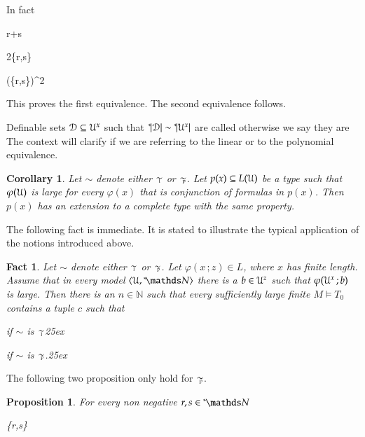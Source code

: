 \documentclass[10pt,oneside, openany]{book}
\renewcommand*{\emph}[1]{%
   \smash{\tikz[baseline]\node[rectangle, fill=green!40, rounded corners, inner xsep=0.5ex, inner ysep=0.2ex, anchor=base, minimum height = 2.7ex]{#1};}}
\def\models{\vDash}
\def\NN{\mathds N}
\def\D{\EuScript D}
\def\U{\EuScript U}
\def\<{\langle}
\def\>{\rangle}
\def\phi{\varphi}
\newcounter{thm}[chapter]
\theoremstyle{mio}
\newtheorem{corollary}[thm]{Corollary}
\newtheorem{proposition}[thm]{Proposition}
\newtheorem{fact}[thm]{Fact}
\theoremstyle{liscio}
\def\QED{\noindent\nolinebreak[4]\hfill\rlap{\ \ $\Box$}\medskip}
\renewenvironment{proof}[1][Proof]%
{\smallskip\begin{trivlist}\item[\hskip\labelsep {\bf #1}]}
{\QED\end{trivlist}}
\def\ns{{}^*\kern-.3ex}
\def\simpoly{\mathrel{\raise-.1ex\rlap{\kern0.6ex\tiny p}\raise.2ex\hbox{$\sim$} }}
\def\simlin{\mathrel{\raise-.3ex\rlap{\kern0.6ex\tiny l}\raise.2ex\hbox{$\sim$} }}
\begin{document}
\begin{proof}
  In fact 

{\le}
{r+s}

\ceq{}
{\le}
{2\max\{r,s\}}

\ceq{}
{\le}
{\big(\max\{r,s\}\big)^2}


This proves the first equivalence.
%
The second equivalence follows.
\end{proof}

Definable sets $\D\subseteq\U^x$ such that  $\ns|\D|\sim\ns|\U^x|$ are called \emph{large,} otherwise we say they are \emph{small.}
%
The context will clarify if we are referring to the linear or to the polynomial equivalence.


\begin{corollary}
  Let $\sim$ denote either $\simlin$ or $\simpoly$.
  Let $p(x)\subseteq L(\U)$ be a type such that $\phi(\U)$ is large for every $\phi(x)$ that is conjunction of formulas in $p(x)$.
  Then $p(x)$ has an extension to a complete type with the same property.\QED
\end{corollary}

The following fact is immediate. It is stated to illustrate the typical application of the notions introduced above.

\begin{fact}\label{fact_application}
  Let $\sim$ denote either $\simlin$ or $\simpoly$.
  Let $\phi(x\,;z)\in L$, where $x$ has finite length.
  Assume that in every model $\<\U,\ns\NN\>$ there is a $b\in\U^{z}$ such that $\phi(\U^x\,;b)$ is large.
  Then there is an $n\in\NN$ such that every sufficiently large finite $M\models T_0$ contains a tuple $c$ such that

  \ceq{\hfill\big|M^x\big|}{\le}{n\,\big|\phi(M^x\,;c)\big|}\hfill if $\sim$ is $\simlin$\phantom{.}\kern25ex
  
  \hfill if $\sim$ is $\simpoly$.\kern25ex\rlap{$\square$}

\end{fact}

The following two proposition only hold for $\simpoly$.

\begin{proposition}\label{prop_+=x}
  For every non negative $r,s\in{}^*\kern-.2ex\NN$

  {\simpoly}
  {\max\{r,s\}}
\end{proposition} 
\end{document}
